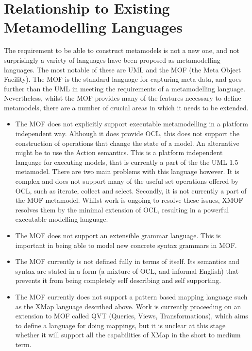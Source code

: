 \section{Relationship to Existing Metamodelling Languages}
\label{differences}

The requirement to be able to construct metamodels is not a new
one, and not surprisingly a variety of languages have been
proposed as metamodelling languages. The most notable of these are
UML and the MOF (the Meta Object Facility). The MOF is the
standard language for capturing meta-data, and goes further than
the UML in meeting the requirements of a metamodelling language.
Nevertheless, whilst the MOF provides many of the features
necessary to define metamodels, there are a number of crucial
areas in which it needs to be extended.

\begin{itemize}
\item The MOF does not explicitly support executable metamodelling in
a platform independent way. Although it does provide OCL, this
does not support the construction of operations that change the
state of a model. An alternative might be to use the Action
semantics. This is a platform independent language for executing
models, that is currently a part of the the UML 1.5 metamodel.
There are two main problems with this language however. It is
complex and does not support many of the useful set operations
offered by OCL, such as iterate, collect and select. Secondly, it
is not currently a part of the MOF metamodel. Whilst work is
ongoing to resolve these issues, XMOF resolves them by the minimal
extension of OCL, resulting in a powerful executable modelling
language.
\item The MOF does not support an extensible grammar language. This is
important in being able to model new concrete syntax grammars in MOF.
\item The MOF currently is not defined fully in terms of itself. Its
semantics and syntax are stated in a form (a mixture of OCL, and
informal English) that prevents it from being completely self
describing and self supporting.
\item The MOF currently does not support a pattern based mapping language
such as the XMap language described above. Work is currently
proceeding on an extension to MOF called QVT (Queries, Views,
Transformations), which aims to define a language for doing
mappings, but it is unclear at this stage whether it will support
all the capabilities of XMap in the short to medium term.
\end{itemize}

